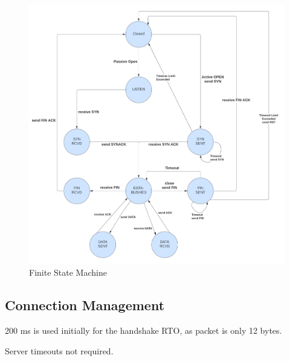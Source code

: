 \documentclass[12pt]{article}
\begin{document}
\begin{figure}[h]
\begin{center}
    \includegraphics[width=120mm]{images/fsm.png}
\end{center}
\caption{Finite State Machine}\label{fig:fsm}
\end{figure}

\subsection{Connection Management}



200 ms is used initially for the handshake RTO, as packet is only 12 bytes.

Server timeouts not required.




\end{document}
